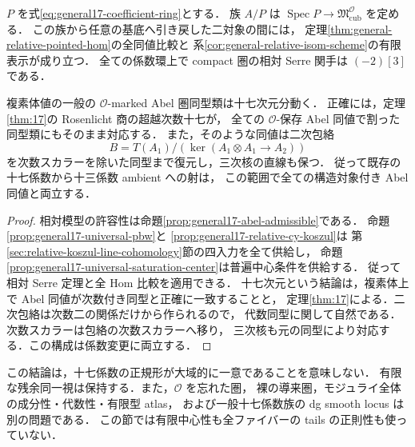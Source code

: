\begin{corollary}
\label{cor:general17-abel-moduli-comparison}
$P$ を式\eqref{eq:general17-coefficient-ring}とする．
族 $A/P$ は $\operatorname{Spec}P\to\mathfrak M^{\mathcal O}_{\mathrm{cub}}$ を定める．
この族から任意の基底へ引き戻した二対象の間には，
定理\ref{thm:general-relative-pointed-hom}の全同値比較と
系\ref{cor:general-relative-isom-scheme}の有限表示が成り立つ．
全ての係数環上で compact 圏の相対 Serre 関手は $(-2)[3]$ である．

複素体値の一般の $\mathcal O$-marked Abel 圏同型類は十七次元分動く．
正確には，定理\ref{thm:17}の Rosenlicht 商の超越次数十七が，
全ての $\mathcal O$-保存 Abel 同値で割った同型類にもそのまま対応する．
また，そのような同値は二次包絡
\[
 B=T(A_1)/(\ker(A_1\otimes A_1\to A_2))
\]
を次数スカラーを除いた同型まで復元し，三次核の直線も保つ．
従って既存の十七係数から十三係数 ambient への射は，
この範囲で全ての構造対象付き Abel 同値と両立する．
\end{corollary}
\begin{proof}
相対模型の許容性は命題\ref{prop:general17-abel-admissible}である．
命題\ref{prop:general17-universal-pbw}と
\ref{prop:general17-relative-cy-koszul}は
第\ref{sec:relative-koszul-line-cohomology}節の四入力を全て供給し，
命題\ref{prop:general17-universal-saturation-center}は普遍中心条件を供給する．
従って相対 Serre 定理と全 Hom 比較を適用できる．
十七次元という結論は，複素体上で Abel 同値が次数付き同型と正確に一致することと，
定理\ref{thm:17}による．二次包絡は次数二の関係だけから作られるので，
代数同型に関して自然である．次数スカラーは包絡の次数スカラーへ移り，
三次核も元の同型により対応する．この構成は係数変更に両立する．
\end{proof}

この結論は，十七係数の正規形が大域的に一意であることを意味しない．
有限な残余同一視は保持する．また，$\mathcal O$ を忘れた圏，
裸の導来圏，モジュライ全体の成分性・代数性・有限型 atlas，
および一般十七係数族の dg smooth locus は別の問題である．
この節では有限中心性も全ファイバーの tails の正則性も使っていない．
